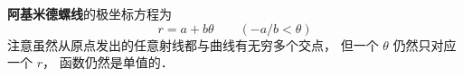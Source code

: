 

\textbf{阿基米德螺线}的极坐标方程为
\begin{equation}
r = a + b\theta \qquad (-a/b < \theta)
\end{equation}
注意虽然从原点发出的任意射线都与曲线有无穷多个交点， 但一个 $\theta$ 仍然只对应一个 $r$， 函数仍然是单值的．

